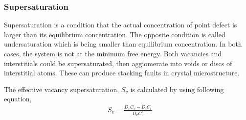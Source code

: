 \documentclass[a4paper]{article}
\begin{document}
    \newpage
    \subsubsection{Supersaturation} \hspace{10pt}
    Supersaturation is a condition that the actual concentration of point defect is larger than its equilibrium concentration. The opposite condition is called undersaturation which is being smaller than equilibrium concentration. In both cases, the system is not at the minimum free energy. Both vacancies and interstitials could be supersaturated, then aggiomerate into voids or discs of interstitial atoms. These can produce stacking faults in crystal microstructure.

    The effective vacancy supersaturation, ${S_v}$ is calculated by using following equation, \cite{was2016}\\

    \begin{equation}
      \begin{aligned}
        &S_v=\frac{D_vC_v-D_iC_i}{D_vC_v^e}\\
      \end{aligned}
    \end{equation}\\
\end{document}

